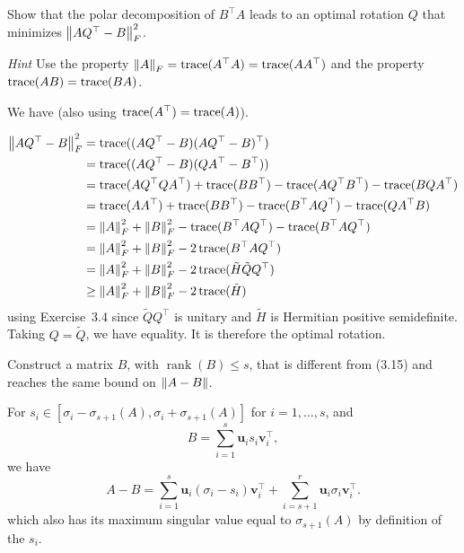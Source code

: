 Show that the polar decomposition of \(B^\top A\) leads to an optimal rotation \(Q\) that minimizes \({\left\lVert AQ^\top - B\right\rVert}_F^2\).

\begin{solution}
	\emph{Hint} Use the property ${\left\lVert A\right\rVert}_F = \operatorname{trace}(A^\top A) = \operatorname{trace}(AA^\top)$ and the property $\operatorname{trace}(AB) = \operatorname{trace}(BA)$.
	
	We have (also using $\operatorname{trace}(A^\top) = \operatorname{trace}(A)$).
	
	\begin{align*}
	{\left\lVert AQ^\top - B\right\rVert}_F^2
	& = \operatorname{trace}((AQ^\top - B)(AQ^\top - B)^\top)\\
	& = \operatorname{trace}((AQ^\top - B)(QA^\top - B^\top))\\
	& = \operatorname{trace}(AQ^\top QA^\top) + \operatorname{trace}(BB^\top) - \operatorname{trace}(AQ^\top B^\top ) - \operatorname{trace}(BQA^\top)\\
	& = \operatorname{trace}(AA^\top) + \operatorname{trace}(BB^\top) - \operatorname{trace}(B^\top AQ^\top) - \operatorname{trace}(QA^\top B)\\
	& = {\left\lVert A\right\rVert}_F^2 + {\left\lVert B\right\rVert}_F^2 - \operatorname{trace}(B^\top AQ^\top) - \operatorname{trace}(B^\top AQ^\top)\\
	& = {\left\lVert A\right\rVert}_F^2 + {\left\lVert B\right\rVert}_F^2 - 2\operatorname{trace}(B^\top AQ^\top)\\
	& = {\left\lVert A\right\rVert}_F^2 + {\left\lVert B\right\rVert}_F^2 - 2\operatorname{trace}(\tilde{H}\tilde{Q} Q^\top)\\
	& \geq {\left\lVert A\right\rVert}_F^2 + {\left\lVert B\right\rVert}_F^2 - 2\operatorname{trace}(\tilde{H})
	\end{align*}
	using Exercise~3.4 since $\tilde{Q}Q^\top$ is unitary and $\tilde{H}$ is Hermitian positive semidefinite.
	Taking $Q = \tilde{Q}$, we have equality. It is therefore the optimal rotation.
\end{solution}

Construct a matrix \(B\), with \(\mathop{\mathrm{rank}}(B) \leq s\), that is different from (3.15) and reaches the same bound on \({\left\lVert A - B\right\rVert}\).

\begin{solution}
	For $s_i \in [\sigma_i - \sigma_{s+1}(A), \sigma_i + \sigma_{s+1}(A)]$ for $i = 1, \ldots, s$,
	and
	\[ B = \sum_{i=1}^s \mathbf{u}_i s_i \mathbf{v}_i^\top, \]
	we have
	\[ A - B = \sum_{i=1}^s \mathbf{u}_i(\sigma_i - s_i)\mathbf{v}_i^\top + \sum_{i=s+1}^r \mathbf{u}_i\sigma_i \mathbf{v}_i^\top. \]
	which also has its maximum singular value equal to $\sigma_{s+1}(A)$ by definition of the $s_i$.
\end{solution}